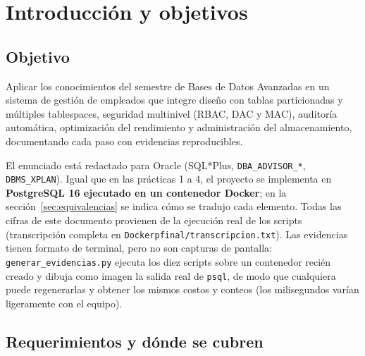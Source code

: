\documentclass[12pt,a4paper]{article}
\begin{document}

\tableofcontents
\newpage

\section{Introducción y objetivos}

\subsection{Objetivo}

Aplicar los conocimientos del semestre de Bases de Datos Avanzadas en un sistema de gestión de empleados que integre diseño con tablas particionadas y múltiples tablespaces, seguridad multinivel (RBAC, DAC y MAC), auditoría automática, optimización del rendimiento y administración del almacenamiento, documentando cada paso con evidencias reproducibles.

El enunciado está redactado para Oracle (SQL*Plus, \texttt{DBA\_\allowbreak{}ADVISOR\_\allowbreak{}*}, \texttt{DBMS\_\allowbreak{}XPLAN}). Igual que en las prácticas 1 a 4, el proyecto se implementa en \textbf{PostgreSQL 16 ejecutado en un contenedor Docker}; en la sección~\ref{sec:equivalencias} se indica cómo se tradujo cada elemento. Todas las cifras de este documento provienen de la ejecución real de los scripts (transcripción completa en \texttt{Dockerpfinal/transcripcion.txt}). Las evidencias tienen formato de terminal, pero no son capturas de pantalla: \texttt{generar\_\allowbreak{}evidencias.py} ejecuta los diez scripts sobre un contenedor recién creado y dibuja como imagen la salida real de \texttt{psql}, de modo que cualquiera puede regenerarlas y obtener los mismos costos y conteos (los milisegundos varían ligeramente con el equipo).

\subsection{Requerimientos y dónde se cubren}
\end{document}
